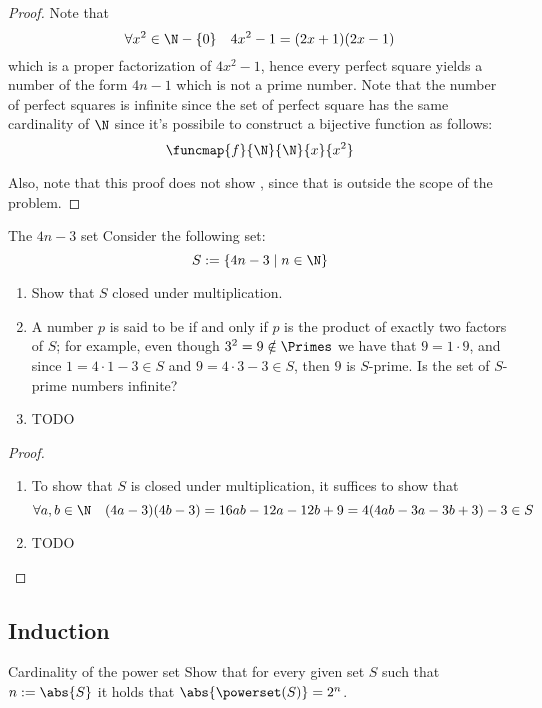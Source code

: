 \documentclass[a4paper, 12pt]{report}
\begin{document}
    \begin{proof}
        Note that $$\forall x^2 \in \N - \{0\} \quad 4x^2 - 1 = (2x +1)(2x -1)$$ which is a proper factorization of $4x^2 -1$, hence every perfect square yields a number of the form $4n -1$ which is not a prime number. Note that the number of perfect squares is infinite since the set of perfect square has the same cardinality of $\N$ since it's possibile to construct a bijective function as follows: $$\funcmap{f}{\N}{\N}{x}{x^2}$$

        Also, note that this proof does not show , since that is outside the scope of the problem.
    \end{proof}

    \begin{framedprob}{The $4n - 3$ set}
        Consider the following set: $$S := \{4n - 3 \mid n \in \N\}$$

        \begin{enumerate}
            \item Show that $S$ closed under multiplication.
            \item A number $p$ is said to be  if and only if $p$ is the product of exactly two factors of $S$; for example, even though $3 ^2 = 9 \notin \Primes$ we have that $9 = 1 \cdot 9$, and since $1 = 4 \cdot 1 - 3 \in S$ and $9 = 4 \cdot 3 - 3 \in S$, then $9$ is $S$-prime. Is the set of $S$-prime numbers infinite?
            \item TODO
        \end{enumerate}
    \end{framedprob}

    \begin{proof}
        \quad
        \begin{enumerate}
            \item To show that $S$ is closed under multiplication, it suffices to show that $$\forall a, b \in \N \quad (4a -3)(4b- 3) = 16ab -12a -12b +9 = 4(4ab - 3a -3b +3) - 3 \in S$$
            \item TODO
        \end{enumerate}
    \end{proof}

    \subsection{Induction}

    \begin{framedprob}{Cardinality of the power set}
        Show that for every given set $S$ such that $n := \abs{S}$ it holds that $\abs{\powerset(S)} = 2^n$.
    \end{framedprob}
\end{document}
